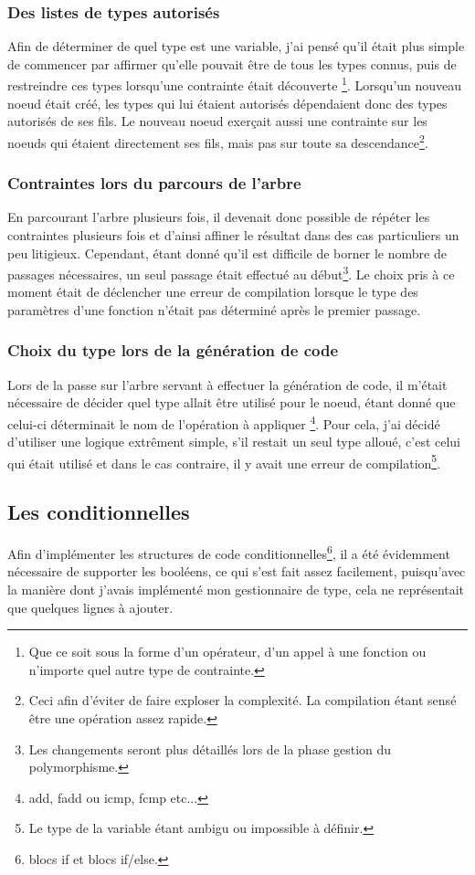 \documentclass[12pt]{article}
\begin{document}
\subsubsection{Des listes de types autorisés}
Afin de déterminer de quel type est une variable, j'ai pensé qu'il était plus
simple de commencer par affirmer qu'elle pouvait être de tous les types
connus, puis de restreindre ces types lorsqu'une contrainte était découverte
\footnote{Que ce soit sous la forme d'un opérateur, d'un appel à une fonction
ou n'importe quel autre type de contrainte.}. Lorsqu'un nouveau noeud était
créé, les types qui lui étaient autorisés dépendaient donc des types autorisés de
ses fils.
Le nouveau noeud exerçait aussi une contrainte sur les noeuds qui étaient
directement ses fils, mais pas sur toute sa descendance\footnote{Ceci afin
d'éviter de faire exploser la complexité. La compilation étant sensé être une
opération assez rapide.}.

\subsubsection{Contraintes lors du parcours de l'arbre}
En parcourant l'arbre plusieurs fois, il devenait donc possible de répéter
les contraintes plusieurs fois et d'ainsi affiner le résultat dans des cas
particuliers un peu litigieux. Cependant, étant donné qu'il est difficile
de borner le nombre de passages nécessaires, un seul passage était effectué
au début\footnote{Les changements seront plus détaillés lors de la phase
gestion du polymorphisme.}. Le choix pris à ce moment était de déclencher une
erreur de compilation lorsque le type des paramètres d'une fonction n'était
pas déterminé après le premier passage.

\subsubsection{Choix du type lors de la génération de code}
Lors de la passe sur l'arbre servant à effectuer la génération de code,
il m'était nécessaire de décider quel type allait être utilisé pour le noeud,
étant donné que celui-ci déterminait le nom de l'opération à appliquer
\footnote{add, fadd ou icmp, fcmp etc...}. Pour cela, j'ai décidé d'utiliser
une logique extrêment simple, s'il restait un seul type alloué, c'est celui
qui était utilisé et dans le cas contraire, il y avait une erreur de
compilation\footnote{Le type de la variable étant ambigu ou impossible
à définir.}.

\subsection{Les conditionnelles}
Afin d'implémenter les structures de code conditionnelles\footnote{blocs if
et blocs if/else.}, il a été évidemment nécessaire de supporter les booléens,
ce qui s'est fait assez facilement, puisqu'avec la manière dont j'avais
implémenté mon gestionnaire de type, cela ne représentait que quelques lignes
à ajouter.\\
\end{document}
